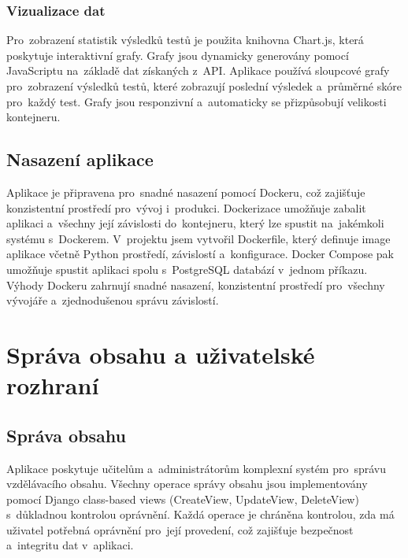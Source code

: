 \documentclass[12pt, a4paper,
twoside,
openany
]{report}
\begin{document}
	\subsection{Vizualizace dat}
	
	Pro~zobrazení statistik výsledků testů je použita knihovna Chart.js, která poskytuje interaktivní grafy. Grafy jsou dynamicky generovány pomocí JavaScriptu na~základě dat získaných z~API. Aplikace používá sloupcové grafy pro~zobrazení výsledků testů, které zobrazují poslední výsledek a~průměrné skóre pro~každý test. Grafy jsou responzivní a~automaticky se přizpůsobují velikosti kontejneru.

	\section{Nasazení aplikace}
	
	Aplikace je připravena pro~snadné nasazení pomocí Dockeru, což zajišťuje konzistentní prostředí pro~vývoj i~produkci. Dockerizace umožňuje zabalit aplikaci a~všechny její závislosti do~kontejneru, který lze spustit na~jakémkoli systému s~Dockerem. V~projektu jsem vytvořil Dockerfile, který definuje image aplikace včetně Python prostředí, závislostí a~konfigurace. Docker Compose pak umožňuje spustit aplikaci spolu s~PostgreSQL databází v~jednom příkazu. Výhody Dockeru zahrnují snadné nasazení, konzistentní prostředí pro~všechny vývojáře a~zjednodušenou správu závislostí.

	\chapter{Správa obsahu a uživatelské rozhraní}

	\section{Správa obsahu}
	
	Aplikace poskytuje učitelům a~administrátorům komplexní systém pro~správu vzdělávacího obsahu. Všechny operace správy obsahu jsou implementovány pomocí Django class-based views (CreateView, UpdateView, DeleteView) s~důkladnou kontrolou oprávnění. Každá operace je chráněna kontrolou, zda má uživatel potřebná oprávnění pro~její provedení, což zajišťuje bezpečnost a~integritu dat v~aplikaci.
	
\end{document}
